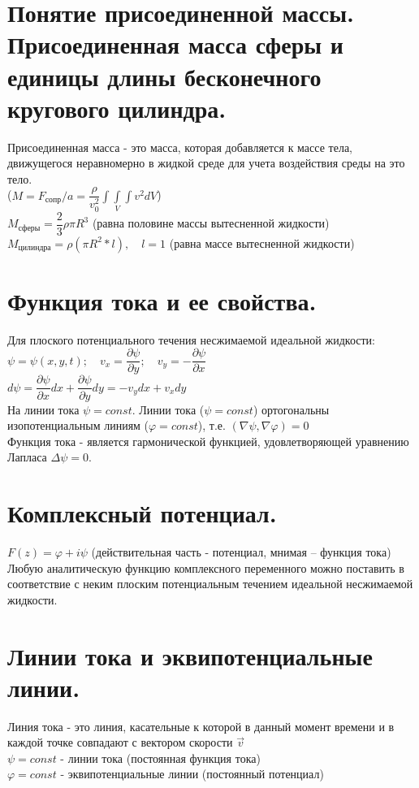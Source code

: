\begin{multicols*}{2}
		\section{Понятие присоединенной массы. Присоединенная масса сферы и единицы длины бесконечного кругового цилиндра.}
		Присоединенная масса - это масса, которая добавляется к массе тела, движущегося неравномерно в жидкой среде для учета воздействия среды на это тело. \\
		($M=F_\text{сопр}/a = \dfrac{\rho}{v^2_0}\int\int\limits_{V}\int v^2dV $) \\
		$M_\text{сферы}=\dfrac{2}{3}\rho\pi R^3$ (равна половине массы вытесненной жидкости)\\
		$M_\text{цилиндра}=\rho(\pi R^2*l),\quad l = 1$ (равна массе вытесненной жидкости)
		
		\section{Функция тока и ее свойства.}
		Для плоского потенциального течения несжимаемой идеальной жидкости: \\
		$\psi = \psi (x, y, t); \quad v_{x}=\dfrac{\partial\psi}{\partial y}; \quad v_{y}=-\dfrac{\partial\psi}{\partial x}$ \\
		$d\psi = \dfrac{\partial\psi}{\partial x}dx + \dfrac{\partial\psi}{\partial y}dy = -v_{y}dx + v_{x}dy$\\
		На линии тока $\psi = const$. Линии тока ($\psi = const$) ортогональны изопотенциальным линиям ($\varphi = const$), т.е. $(\nabla\psi, \nabla\varphi)=0$\\
		Функция тока - является гармонической функцией, удовлетворяющей уравнению Лапласа $\Delta \psi = 0$. 
		
		\section{Комплексный потенциал.}
		$F(z)=\varphi+i\psi$ (действительная часть - потенциал, мнимая – функция тока)\\
		Любую аналитическую функцию комплексного переменного можно поставить в соответствие с неким плоским потенциальным течением идеальной несжимаемой жидкости.
		
		\section{Линии тока и эквипотенциальные линии.}
		Линия тока - это линия, касательные к которой в данный момент времени и в каждой точке совпадают с вектором скорости  $\vec{v}$ \\
		$\psi = const$ - линии тока (постоянная функция тока) \\
		$\varphi = const$ - эквипотенциальные линии (постоянный потенциал)
		

\end{multicols*}

